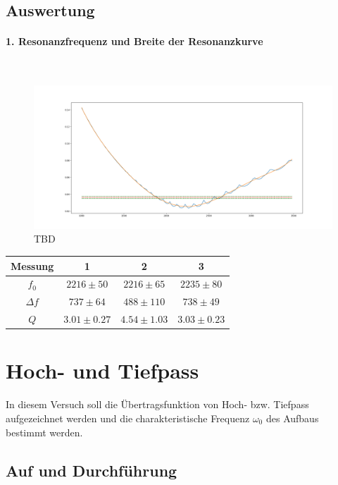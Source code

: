 \documentclass[12pt,a4paper]{article}
\begin{document}
\subsection{Auswertung}
\paragraph{1. Resonanzfrequenz und Breite der Resonanzkurve}\mbox{}\\
\begin{figure}
\centering
\includegraphics[scale=0.4]{Bilder/Parallel_Iges.png}
\caption{TBD}
\label{fig:Serie_Resonanzkurve_A_5}
\end{figure}

\begin{table}
\begin{tabular}{|c|c|c|c|}
\hline
Messung & 1&2&3\\
\hline
$f_0$ & $2216\pm 50 $ & $2216\pm 65 $ & $2235\pm 80$\\
\hline
$\Delta f$ & $737\pm 64 $ & $488\pm 110 $ & $738\pm 49$\\
\hline
$Q$ & $3.01\pm 0.27 $ & $4.54\pm 1.03 $ & $3.03\pm 0.23$\\
\hline
\end{tabular}
\end{table}


\section{Hoch- und Tiefpass}


In diesem Versuch soll die Übertragsfunktion von Hoch- bzw. Tiefpass aufgezeichnet werden und die charakteristische Frequenz $\omega_0$ des Aufbaus bestimmt werden.

\subsection{Auf und Durchführung}
\end{document}
